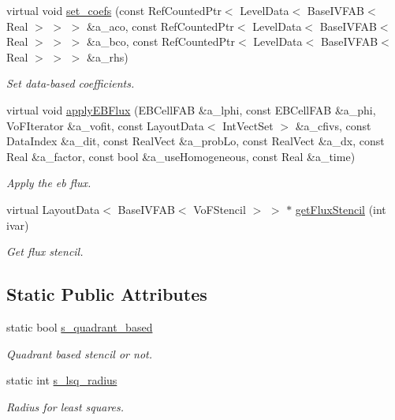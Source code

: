 \begin{DoxyCompactItemize}
virtual void \hyperlink{classrobinconductivityebbc_ac8e594dc189376a22f73e5eb9f3a2d1c}{set\+\_\+coefs} (const Ref\+Counted\+Ptr$<$ Level\+Data$<$ Base\+I\+V\+F\+AB$<$ Real $>$ $>$ $>$ \&a\+\_\+aco, const Ref\+Counted\+Ptr$<$ Level\+Data$<$ Base\+I\+V\+F\+AB$<$ Real $>$ $>$ $>$ \&a\+\_\+bco, const Ref\+Counted\+Ptr$<$ Level\+Data$<$ Base\+I\+V\+F\+AB$<$ Real $>$ $>$ $>$ \&a\+\_\+rhs)
\begin{DoxyCompactList}\small\item\em Set data-\/based coefficients. \end{DoxyCompactList}\item 
virtual void \hyperlink{classrobinconductivityebbc_aedac1867a694ad57d8f8162c763f7e0e}{apply\+E\+B\+Flux} (E\+B\+Cell\+F\+AB \&a\+\_\+lphi, const E\+B\+Cell\+F\+AB \&a\+\_\+phi, Vo\+F\+Iterator \&a\+\_\+vofit, const Layout\+Data$<$ Int\+Vect\+Set $>$ \&a\+\_\+cfivs, const Data\+Index \&a\+\_\+dit, const Real\+Vect \&a\+\_\+prob\+Lo, const Real\+Vect \&a\+\_\+dx, const Real \&a\+\_\+factor, const bool \&a\+\_\+use\+Homogeneous, const Real \&a\+\_\+time)
\begin{DoxyCompactList}\small\item\em Apply the eb flux. \end{DoxyCompactList}\item 
virtual Layout\+Data$<$ Base\+I\+V\+F\+AB$<$ Vo\+F\+Stencil $>$ $>$ $\ast$ \hyperlink{classrobinconductivityebbc_af1e4bb9c229f22fea211697ff230f2e0}{get\+Flux\+Stencil} (int ivar)
\begin{DoxyCompactList}\small\item\em Get flux stencil. \end{DoxyCompactList}\end{DoxyCompactItemize}
\subsection*{Static Public Attributes}
\begin{DoxyCompactItemize}
\item 
static bool \hyperlink{classrobinconductivityebbc_aaa2b49a3ee0cc87551dd7df63c2f191b}{s\+\_\+quadrant\+\_\+based}
\begin{DoxyCompactList}\small\item\em Quadrant based stencil or not. \end{DoxyCompactList}\item 
static int \hyperlink{classrobinconductivityebbc_aeb64ed54a5a9dee936731b3be7dba6ca}{s\+\_\+lsq\+\_\+radius}
\begin{DoxyCompactList}\small\item\em Radius for least squares. \end{DoxyCompactList}\end{DoxyCompactItemize}
